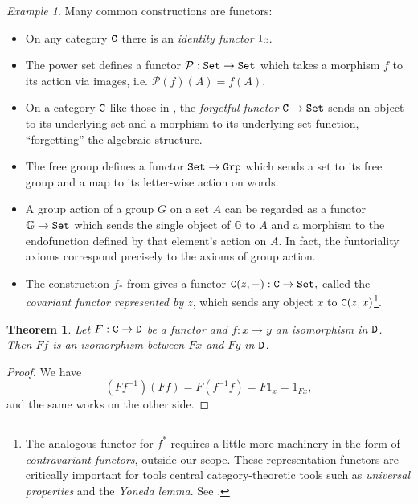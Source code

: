 \documentclass[11 pt]{amsart}
\theoremstyle{plain}   %
\newtheorem{thm}{Theorem}[section] %
\theoremstyle{definition}
\theoremstyle{remark}
\newtheorem{ex}{Example}[section]
\numberwithin{equation}{section}
\def\cP{\mathcal{P}}
\def\GG{\mathbb{G}}
\newcommand{\cat}[1]{{\normalfont\texttt{#1}}}
\begin{document}
\begin{ex}\label{functors}
	Many common constructions are functors:
	\begin{itemize}
		\item On any category $\cat{C}$ there is an \emph{identity functor}
		      $1_\cat{C}$.
		\item The power set defines a functor $\cP:
			      \cat{Set}\rightarrow\cat{Set}$ which takes a morphism $f$ to its
		      action via images, i.e. $\cP(f)(A) = f(A)$.
		\item On a category $\cat{C}$ like those in , the
		      \emph{forgetful functor} $\cat{C}\rightarrow\cat{Set}$ sends an object to
		      its underlying set and a morphism to its underlying set-function,
		      ``forgetting'' the algebraic structure.
		\item The free group defines a functor $\cat{Set}\rightarrow\cat{Grp}$ which
		      sends a set to its free group and a map to its letter-wise action on
		      words.
		\item A group action of a group $G$ on a set $A$ can be regarded as a functor
		      $\GG\rightarrow\cat{Set}$ which sends the single object of $\GG$ to $A$ and
		      a morphism to the endofunction defined by that element's action on
		      $A$. In fact, the funtoriality axioms correspond precisely to the
		      axioms of group action.
		\item The construction $f_*$ from  gives
		      a functor $\cat{C}(z, -): \cat{C}\rightarrow\cat{Set},$ called the
		      \emph{covariant functor represented by $z$}, which sends any object $x$ to
		      $\cat{C}(z, x)$\footnote{The analogous functor for $f^*$ requires a
			      little more machinery in the form of \emph{contravariant functors}, outside
			      our scope. These representation functors are critically important
			      for tools central category-theoretic tools such as \emph{universal
				      properties} and the \emph{Yoneda lemma}. See \cite[Chapter 2]{Riehl}.}.
	\end{itemize}
\end{ex}

\begin{thm}\label{functors preserve isomorphism}
	Let $F: \cat{C}\rightarrow \cat{D}$ be a functor and $f: x\rightarrow y$ an isomorphism in
	$\cat{D}$. Then $Ff$ is an isomorphism between $Fx$ and $Fy$ in $\cat{D}$.
\end{thm}

\begin{proof}
	We have $$(Ff^{-1})(Ff) = F(f^{-1}f) = F1_x = 1_{Fx},$$
	and the same works on the other side.
\end{proof}
\end{document}
